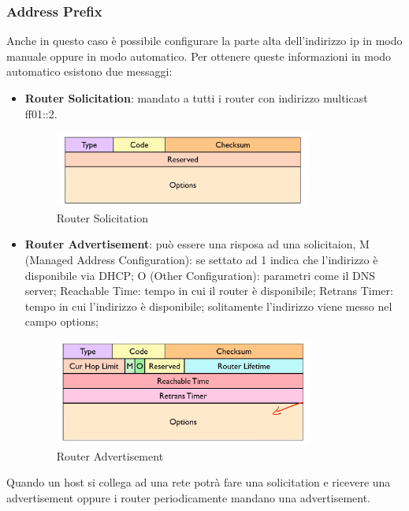 \documentclass[12pt]{article}
\begin{document}
\subsubsection{Address Prefix}
Anche in questo caso \`e possibile configurare la parte alta dell'indirizzo ip in modo manuale oppure in modo automatico. Per ottenere queste informazioni in modo automatico esistono due messaggi:
\begin{itemize}
    \item \textbf{Router Solicitation}: mandato a tutti i router con indirizzo multicast ff01::2.
        \begin{figure}[H]
            \centering
            \includegraphics[width=0.8\textwidth]{router-solicitation.png}
            \caption{Router Solicitation}
            \label{fig:router-solicitation}
        \end{figure}
    \item \textbf{Router Advertisement}: pu\`o essere una risposa ad una solicitaion, M (Managed Address Configuration): se settato ad 1 indica che l'indirizzo \`e disponibile via DHCP; O (Other Configuration): parametri come il DNS server; Reachable Time: tempo in cui il router \`e disponibile; Retrans Timer: tempo in cui l'indirizzo \`e disponibile; solitamente l'indirizzo viene messo nel campo options;
        \begin{figure}[H]
            \centering
            \includegraphics[width=0.8\textwidth]{router-advertisement.png}
            \caption{Router Advertisement}
            \label{fig:router-advertisement}
        \end{figure}
\end{itemize}
Quando un host si collega ad una rete potr\`a fare una solicitation e ricevere una advertisement oppure i router periodicamente mandano una advertisement.
\end{document}
